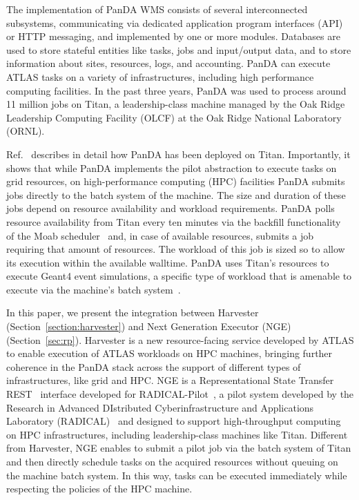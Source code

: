 \documentclass{webofc}
\begin{document}
The implementation of PanDA WMS consists of several interconnected
subsystems, communicating via dedicated application program interfaces (API)
or HTTP messaging, and implemented by one or more modules. Databases are used
to store stateful entities like tasks, jobs and input/output data, and to
store information about sites, resources, logs, and accounting. PanDA can
execute ATLAS tasks on a variety of infrastructures, including high
performance computing facilities. In the past three years, PanDA was used to
process around 11 million jobs on Titan, a leadership-class machine managed
by the Oak Ridge Leadership Computing Facility (OLCF) at the Oak Ridge
National Laboratory (ORNL).

Ref.~\citep{Doleynik2017high} describes in detail how PanDA has been deployed
on Titan. Importantly, it shows that while PanDA implements the pilot
abstraction to execute tasks on grid resources, on high-performance computing
(HPC) facilities PanDA submits jobs directly to the batch system of the
machine. The size and duration of these jobs depend on resource availability
and workload requirements. PanDA polls resource availability from Titan every
ten minutes via the backfill functionality~\citep{moab-backfill} of the Moab
scheduler~\citep{guide2011moab} and, in case of available resources, submits a
job requiring that amount of resources. The workload of this job is sized so
to allow its execution within the available walltime. PanDA uses Titan’s
resources to execute Geant4 event simulations, a specific type of workload
that is amenable to execute via the machine’s batch
system~\citep{agostinelli2003geant4}.

In this paper, we present the integration between Harvester
(Section~\ref{section:harvester}) and Next Generation Executor
(NGE)~\citep{nge-git} (Section~\ref{sec:rp}). Harvester is a new
resource-facing service developed by ATLAS to enable execution of ATLAS
workloads on HPC machines, bringing further coherence in the PanDA stack
across the support of different types of infrastructures, like grid and HPC.
NGE is a Representational State Transfer REST~\citep{battle2008bridging}
interface developed for
RADICAL-Pilot~\citep{rp-docs,Merzky2018DesignAP,merzky2018using}, a pilot
system developed by the Research in Advanced DIstributed Cyberinfrastructure
and Applications Laboratory (RADICAL)~\citep{radical-web} and designed to
support high-throughput computing on HPC infrastructures, including
leadership-class machines like Titan. Different from Harvester, NGE enables
to submit a pilot job via the batch system of Titan and then directly
schedule tasks on the acquired resources without queuing on the machine batch
system. In this way, tasks can be executed immediately while respecting the
policies of the HPC machine.
\end{document}
